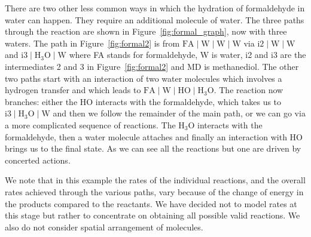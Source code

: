 \documentclass[preprint,12pt]{elsarticle}
\newcommand{\paral}{\; \vert \;}
\begin{document}
There are two other less common ways in which the hydration of formaldehyde in water can happen. 
They require an additional molecule of water.
The three paths through the reaction are shown in Figure~\ref{fig:formal_graph}, now with three waters. 
The path in Figure~\ref{fig:formal2} is from $\mathrm{FA \paral W \paral W \paral W}$ via 
$\mathrm{i2 \paral W \paral W}$ and
$\mathrm{i3 \paral H_3O \paral W}$ where FA stands for formaldehyde, W is water, i2 and i3 are the
intermediates 2 and 3 in Figure~\ref{fig:formal2} and MD is methanediol. 
The other two paths start with an interaction of two water molecules which involves 
a hydrogen transfer and which leads to $\mathrm{FA \paral W \paral HO \paral H_3O}$. The reaction now branches:
either the HO interacts with the formaldehyde, which takes us to $\mathrm{i3 \paral H_3O \paral W}$
and then we follow the remainder of the main path, or we can go via a more complicated sequence of
reactions. The $\mathrm{H_3O}$ interacts with the formaldehyde, then a water molecule attaches 
and finally an interaction with HO brings us to the final state. 
As we can see all the reactions but one are driven 
by concerted actions.

We note that in this example the rates of the individual reactions, and the overall 
rates achieved through the various paths, vary because of the change of energy in the products 
compared to the reactants. We have decided not to model rates at this stage but rather
to concentrate on obtaining all possible valid reactions. We also do not consider
spatial arrangement of molecules.
\end{document}

